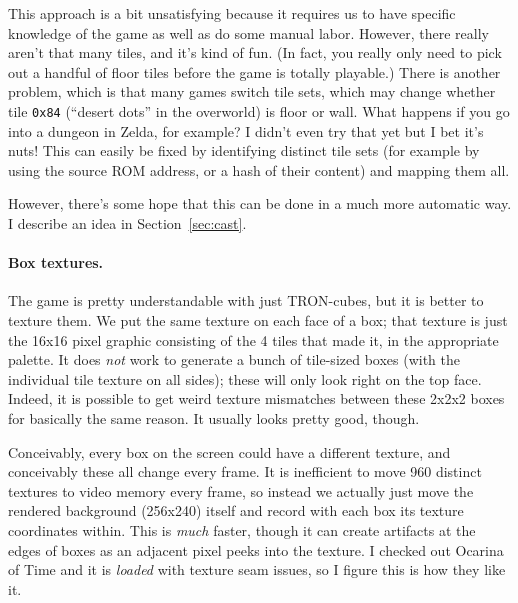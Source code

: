 \documentclass[twocolumn]{article}
\begin{document}
This approach is a bit unsatisfying because it requires us to have
specific knowledge of the game as well as do some manual labor.
However, there really aren't that many tiles, and it's kind of fun.
(In fact, you really only need to pick out a handful of floor tiles
before the game is totally playable.) There is another problem, which
is that many games switch tile sets, which may change whether tile
\verb+0x84+ (``desert dots'' in the overworld) is floor or wall. What
happens if you go into a dungeon in Zelda, for example? I didn't even
try that yet but I bet it's nuts! This can easily be fixed by
identifying distinct tile sets (for example by using the source ROM
address, or a hash of their content) and mapping them all.

However, there's some hope that this can be done in a much more
automatic way. I describe an idea in Section~\ref{sec:cast}.

\paragraph{Box textures.}
The game is pretty understandable with just TRON-cubes, but it is
better to texture them. We put the same texture on each face of a box;
that texture is just the 16x16 pixel graphic consisting of the 4 tiles
that made it, in the appropriate palette. It does {\it not} work to
generate a bunch of tile-sized boxes (with the individual tile texture
on all sides); these will only look right on the top face. Indeed, it
is possible to get weird texture mismatches between these 2x2x2 boxes
for basically the same reason. It usually looks pretty good, though.

Conceivably, every box on the screen could have a different texture,
and conceivably these all change every frame. It is inefficient to
move 960 distinct textures to video memory every frame, so instead we
actually just move the rendered background (256x240) itself and record
with each box its texture coordinates within. This is {\it much}
faster, though it can create artifacts at the edges of boxes as an
adjacent pixel peeks into the texture. I checked out Ocarina of Time
and it is {\it loaded} with texture seam issues, so I figure this is
how they like it.
\end{document}
